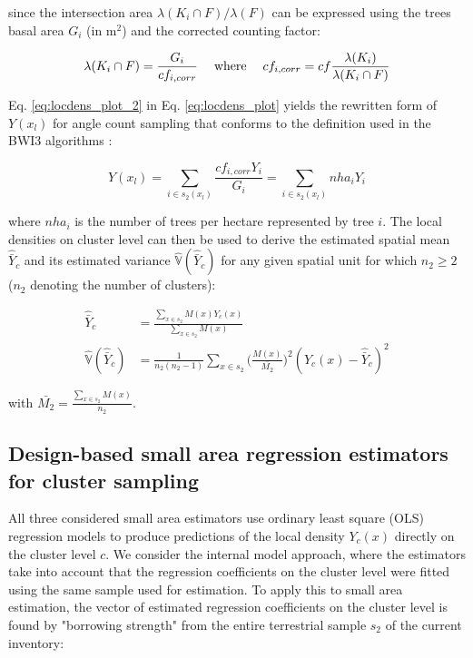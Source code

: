 \documentclass[remotesensing,article,submit,moreauthors,pdftex,10pt,a4paper]{mdpi}
\newcommand{\var}{\mathbb{V}}
\begin{document}
\noindent since the intersection area $\lambda(K_i \cap F)/\lambda(F)$ can be expressed using the trees basal area $G_i$ (in m$^2$) and the corrected counting factor:

\begin{equation}\label{eq:locdens_plot_3}
\lambda(K_i \cap F) = \frac{G_i}{cf_{i, corr}} \hspace{3ex} \text{where} \hspace{3ex} cf_{i,corr} = cf\frac{\lambda(K_i)}{\lambda(K_i \cap F)}
\end{equation}

Eq. \ref{eq:locdens_plot_2} in Eq. \ref{eq:locdens_plot} yields the rewritten form of $Y(x_l)$ for angle count sampling that conforms to the definition used in the BWI3 algorithms \citep{bwi3_ausw}:

\begin{equation}\label{eq:locdens_plot_4}
Y(x_l)= \sum_{i \in s_{2}(x_l)} \frac{cf_{i, corr}Y_i}{G_i} = \sum_{i \in s_{2}(x_l)} nha_{i}{Y_i}
\end{equation}

\noindent where $nha_i$ is the number of trees per hectare represented by tree $i$. The local densities on cluster level can then be used to derive the estimated spatial mean $\hat{\bar{Y}}_c$ and its estimated variance $\hat{\var}(\hat{\bar{Y}}_c)$ for any given spatial unit for which $n_2 \geq 2$ ($n_2$ denoting the number of clusters):

\begin{subequations}\label{eq:srs_est_clusters}
	\begin{align}
	\hat{\bar{Y}}_c &= \frac{\sum_{x \in s_2} M(x) Y_{c}(x)}{\sum_{x \in s_2} M(x)} \\
	\hat{\var}(\hat{\bar{Y}}_c) &= \frac{1}{n_2(n_2 - 1)}\sum_{x \in s_2}\Big(\frac{M(x)}{\bar{M_2}}\Big)^2(Y_{c}(x) - \hat{\bar{Y}}_c)^2
	\end{align}
\end{subequations}

with $\bar{M_2}=\frac{\sum_{x \in s_{2}}M(x)}{n_{2}}$.


\subsection{Design-based small area regression estimators for cluster sampling}
\label{sec:SAestimators}

All three considered small area estimators use ordinary least square (OLS) regression models to produce predictions of the local density $Y_{c}(x)$ directly on the cluster level $c$. We consider the internal model approach, where the estimators take into account that the regression coefficients on the cluster level were fitted using the same sample used for estimation. To apply this to small area estimation, the vector of estimated regression coefficients on the cluster level is found by "borrowing strength" from the entire terrestrial sample $s_2$ of the current inventory:
\end{document}
